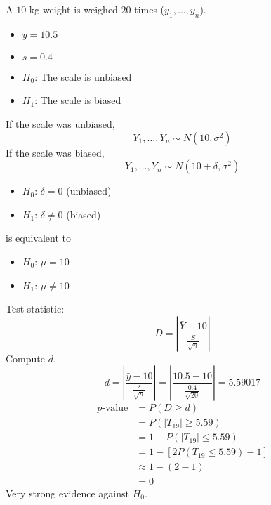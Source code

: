 \begin{exbox}
    \begin{example}[Bias]
        A $ 10 $ kg weight is weighed $ 20 $ times ($ y_1,\ldots ,y_n $).
        \begin{itemize}
            \item $ \bar{y}=10.5 $
            \item $ s=0.4 $
            \item $ H_0 $: The scale is unbiased
            \item $ H_1 $: The scale is biased
        \end{itemize}
        If the scale was unbiased,
        \[ Y_1,\ldots ,Y_n \sim N(10,\sigma^2) \]
        If the scale was biased,
        \[ Y_1,\ldots ,Y_n \sim N(10+\delta,\sigma^2) \]
        \begin{itemize}
            \item $ H_0 $: $ \delta=0 $ (unbiased)
            \item $ H_1 $: $ \delta\neq 0 $ (biased)
        \end{itemize}
        is equivalent to
        \begin{itemize}
            \item $ H_0 $: $ \mu=10 $
            \item $ H_1 $: $ \mu\neq 10 $
        \end{itemize}
        Test-statistic:
        \[ D=\left|\frac{\bar{Y}-10}{\frac{S}{\sqrt{n}}} \right| \]
        Compute $ d $.
        \[ d=
            \left|\frac{\bar{y}-10}{\frac{s}{\sqrt{n}}} \right|=
            \left|\frac{10.5-10}{\frac{0.4}{\sqrt{20}}} \right|=5.59017 \]
        \[
            \begin{aligned}
                p\text{-value}
                 & =P(D\geqslant d)                             \\
                 & =P(|T_{19}|\geqslant 5.59)                   \\
                 & = 1-P(|T_{19}|\leqslant 5.59)                \\
                 & =1-\left[ 2P(T_{19}\leqslant 5.59)-1 \right] \\
                 & \approx 1-(2-1)                              \\
                 & =0
            \end{aligned}
        \]
        Very strong evidence against $ H_0 $.
    \end{example}
\end{exbox}

